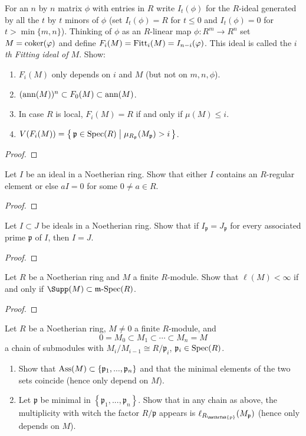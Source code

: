 \begin{problem}
For an $n$ by $n$ matrix $\phi$ with entries in $R$ write
$I_t(\phi)$ for the $R$-ideal generated by all the $t$ by $t$
minors of $\phi$ (set $I_t(\phi)=R$ for $t\leq 0$ and
$I_t(\phi)=0$ for $t>\min\{m,n\}$). Thinking of $\phi$ as an
$R$-linear map $\phi\colon R^m\to R^n$ set $M=\operatorname{coker}(\varphi)$ and
define $F_i(M)=\operatorname{Fitt}_i(M)=I_{n-i}(\varphi)$. This ideal is called
the \emph{$i$th Fitting ideal of $M$}. Show:
\begin{enumerate}[label=(\alph*)]
\item $F_i(M)$ only depends on $i$ and $M$ (but not on
  $m,n,\phi$).
\item $(\operatorname{ann}(M))^n\subset F_0(M)\subset\operatorname{ann}(M)$.
\item In case $R$ is local, $F_i(M)=R$ if and only if $\mu(M)\leq
  i$.
\item
  $V(F_i(M))=
\left\{\,\mathfrak{p}\in\operatorname{Spec}(R)\;\middle|\;\mu_{R_{\mathfrak{p}}}(M_{\mathfrak{p}})>i\,\right\}$.
\end{enumerate}
\end{problem}
\begin{proof}
\end{proof}
\newpage
\begin{problem}
Let $I$ be an ideal in a Noetherian ring. Show that either $I$
contains an $R$-regular element or else $aI=0$ for some $0\neq
a\in R$.
\end{problem}
\begin{proof}
\end{proof}
\newpage
\begin{problem}
Let $I\subset J$ be ideals in a Noetherian ring. Show that if
$I_{\mathfrak{p}}=J_{\mathfrak{p}}$ for every associated prime
$\mathfrak{p}$ of $I$, then $I=J$.
\end{problem}
\begin{proof}
\end{proof}
\newpage
\begin{problem}
Let $R$ be a Noetherian ring and $M$ a finite $R$-module. Show
that $\ell(M)<\infty$ if and only  if
$\Supp(M)\subset\MSpec(R)$.
\end{problem}
\begin{proof}
\end{proof}
\newpage
\begin{problem}
Let $R$ be a Noetherian ring, $M\neq 0$ a finite $R$-module, and
\[
0=M_0\subset M_1\subset \cdots\subset M_n=M
\]
a chain of submodules with $M_i/M_{i-1}\cong R/\mathfrak{p}_i$,
$\mathfrak{p}_i\in\operatorname{Spec}(R)$.
\begin{enumerate}[label=(\alph*)]
\item Show that
  $\operatorname{Ass}(M)\subset\left\{\mathfrak{p}_1,...,\mathfrak{p}_n\right\}$
  and that the minimal elements of the two sets coincide (hence
  only depend on $M$).
\item Let $\mathfrak{p}$ be minimal in
  $\left\{\mathfrak{p}_1,...,\mathfrak{p}_n\right\}$. Show that
  in any chain as above, the multiplicity with witch the factor
  $R/\mathfrak{p}$ appears is
  $\ell_{R_{\mathrfak{p}}}(M_{\mathfrak{p}})$ (hence only depends
  on $M$).
\end{enumerate}
\end{problem}
